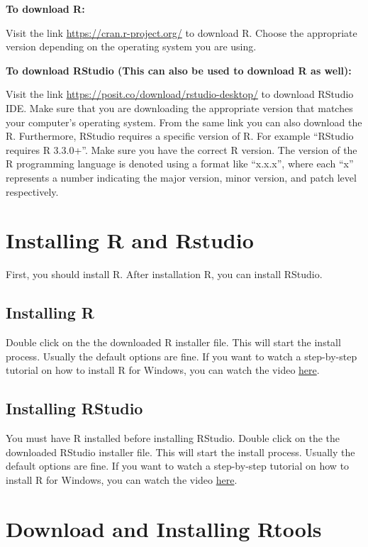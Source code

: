 \documentclass[
  letterpaper,
  DIV=11,
  numbers=noendperiod]{scrreprt}
\begin{document}
\textbf{To download R:}

Visit the link \url{https://cran.r-project.org/} to download R. Choose
the appropriate version depending on the operating system you are using.

\textbf{To download RStudio (This can also be used to download R as
well):}

Visit the link \url{https://posit.co/download/rstudio-desktop/} to
download RStudio IDE. Make sure that you are downloading the appropriate
version that matches your computer's operating system. From the same
link you can also download the R. Furthermore, RStudio requires a
specific version of R. For example ``RStudio requires R 3.3.0+''. Make
sure you have the correct R version. The version of the R programming
language is denoted using a format like ``x.x.x'', where each ``x''
represents a number indicating the major version, minor version, and
patch level respectively.

\section{Installing R and Rstudio}\label{installing-r-and-rstudio}

First, you should install R. After installation R, you can install
RStudio.

\subsection{Installing R}\label{installing-r}

Double click on the the downloaded R installer file. This will start the
install process. Usually the default options are fine. If you want to
watch a step-by-step tutorial on how to install R for Windows, you can
watch the video
\href{https://www.youtube.com/watch?v=aRwxsAEoRzs}{here}.

\subsection{Installing RStudio}\label{installing-rstudio}

You must have R installed before installing RStudio. Double click on the
the downloaded RStudio installer file. This will start the install
process. Usually the default options are fine. If you want to watch a
step-by-step tutorial on how to install R for Windows, you can watch the
video \href{https://www.youtube.com/watch?v=Q1NRj2Dzdn0}{here}.

\section{Download and Installing
Rtools}\label{download-and-installing-rtools}
\end{document}
